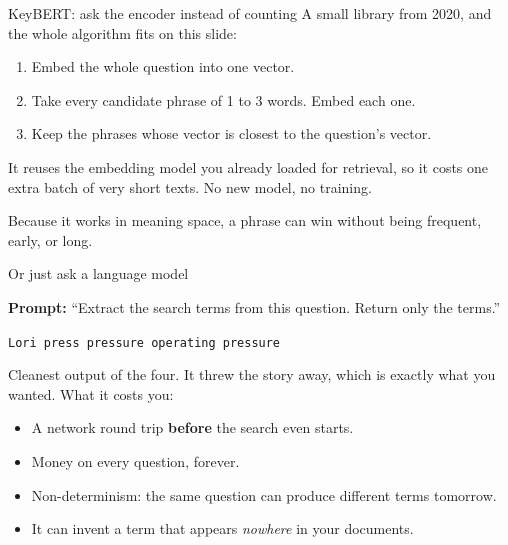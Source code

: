 \documentclass[aspectratio=169]{beamer}
\newcommand{\keybox}[1]{%
  \begin{tcolorbox}[colback=armblue!8, colframe=armblue, boxrule=0.6pt, arc=2pt]
  #1
  \end{tcolorbox}}
\begin{document}
\begin{frame}{KeyBERT: ask the encoder instead of counting}
  \vspace{0.6em}
  A small library from 2020, and the whole algorithm fits on this slide:

  \vspace{0.8em}
  \begin{enumerate}
    \item[\textbf{1.}] Embed the whole question into one vector.
    \item[\textbf{2.}] Take every candidate phrase of 1 to 3 words. Embed each one.
    \item[\textbf{3.}] Keep the phrases whose vector is closest to the question's vector.
  \end{enumerate}

  \vspace{1.0em}
  \keybox{It reuses the embedding model you already loaded for retrieval, so it costs one
  extra batch of very short texts. No new model, no training.}

  \vspace{0.6em}
  {\small Because it works in meaning space, a phrase can win without being frequent,
  early, or long.}
\end{frame}

\begin{frame}{Or just ask a language model}
  \vspace{0.4em}
  \begin{center}
  \begin{tcolorbox}[colback=lightbg, colframe=gray, boxrule=0.5pt, arc=2pt, width=0.9\textwidth]
    \small
    \textbf{Prompt:} ``Extract the search terms from this question. Return only the terms.''
  \end{tcolorbox}
  \end{center}

  \vspace{0.3em}
  \begin{center}
  \begin{tcolorbox}[colback=armblue!8, colframe=armblue, boxrule=0.6pt, arc=2pt, width=0.9\textwidth]
    \small \texttt{Lori press \quad pressure \quad operating pressure}
  \end{tcolorbox}
  \end{center}

  \vspace{0.6em}
  Cleanest output of the four. It threw the story away, which is exactly what you wanted.
  What it costs you:

  \vspace{0.4em}
  \begin{itemize}
    \item {\small A network round trip \textbf{before} the search even starts.}
    \item {\small Money on every question, forever.}
    \item {\small Non-determinism: the same question can produce different terms tomorrow.}
    \item {\small It can invent a term that appears \emph{nowhere} in your documents.}
  \end{itemize}
\end{frame}
\end{document}
